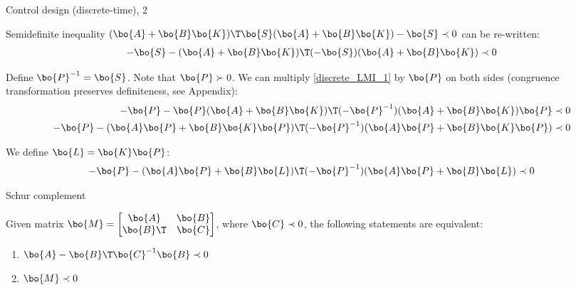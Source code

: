 \documentclass{beamer}
\begin{document}
\begin{frame}{Control design (discrete-time), 2}
	\begin{flushleft}
		
		Semidefinite inequality $(\bo{A} + \bo{B}\bo{K})\T \bo{S} (\bo{A} + \bo{B}\bo{K}) - \bo{S} \prec 0$ can be re-written:
		\begin{align}
			\label{discrete_LMI_1}
			-\bo{S} - (\bo{A} + \bo{B}\bo{K})\T (-\bo{S}) (\bo{A} + \bo{B}\bo{K})  \prec 0
		\end{align}
		
		Define $\bo{P}^{-1} = \bo{S}$. Note that $\bo{P} \succ 0$. We can  multiply \eqref{discrete_LMI_1} by $\bo{P}$ on both sides (congruence transformation preserves definiteness, see Appendix):
		\begin{align}
			-\bo{P} - \bo{P}(\bo{A} + \bo{B}\bo{K})\T (-\bo{P}^{-1}) (\bo{A} + \bo{B}\bo{K})\bo{P}  \prec 0
			\\
			-\bo{P} - (\bo{A}\bo{P} + \bo{B}\bo{K}\bo{P})\T (-\bo{P}^{-1}) (\bo{A}\bo{P} + \bo{B}\bo{K}\bo{P})  \prec 0
		\end{align}
	
		We define $\bo{L} = \bo{K}\bo{P}$:
		\begin{align}
			-\bo{P} - (\bo{A}\bo{P} + \bo{B}\bo{L})\T (-\bo{P}^{-1}) (\bo{A}\bo{P} + \bo{B}\bo{L})  \prec 0
		\end{align}
		
	\end{flushleft}
\end{frame}



\begin{frame}{Schur complement}
	\begin{flushleft}
		
		\begin{theorem}
			Given matrix $\bo{M} = \begin{bmatrix}
				\bo{A} & \bo{B} \\
				\bo{B}\T & \bo{C}
			\end{bmatrix}$, where $\bo{C} \prec 0$, 
			the following statements are equivalent:
			\begin{enumerate}
				\item $\bo{A} - \bo{B}\T \bo{C}^{-1}\bo{B} \prec 0$
				\item $\bo{M} \prec 0$
			\end{enumerate}
		\end{theorem}
		
		
		
	\end{flushleft}
\end{frame}
\end{document}
